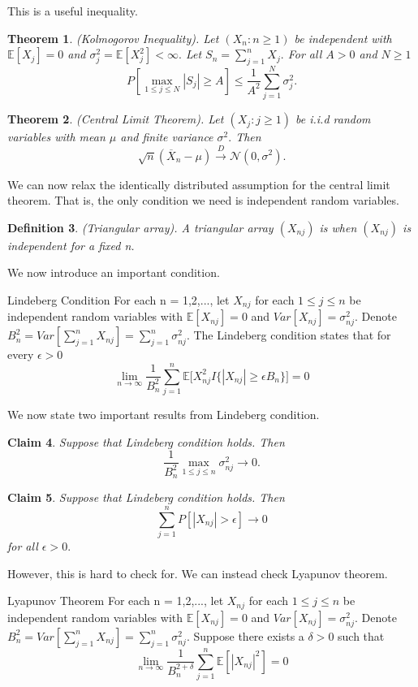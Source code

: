 \documentclass[twoside]{article}
\newcounter{lecnum}
\newtheorem{theorem}{Theorem}[lecnum]
\newtheorem{claim}[theorem]{Claim}
\newtheorem{definition}[theorem]{Definition}
\begin{document}
This is a useful inequality.
\begin{theorem}(Kolmogorov Inequality). Let $(X_n: n \geq 1)$ be independent with $\mathbb{E}[X_j] = 0$ and $\sigma_{j}^{2} = \mathbb{E}[X_j^2] < \infty.$ Let $S_n = \sum_{j=1}^{n}X_j.$ For all $A > 0$ and $N \geq 1$
$$
P[\max_{1 \leq j \leq N}|S_j| \geq A] \leq \frac{1}{A^2}\sum_{j=1}^{N}\sigma_{j}^{2}.
$$
\end{theorem}

\begin{theorem}(Central Limit Theorem). Let $(X_j: j \geq 1)$ be i.i.d random variables with mean $\mu$ and finite variance $\sigma^2.$ Then 
$$
\sqrt{n}(\overline{X}_n - \mu) \xrightarrow{D} \mathcal{N}(0, \sigma^2).
$$
\end{theorem}


We can now relax the identically distributed assumption for the central limit theorem. That is, the only condition we need is independent random variables. 

\begin{definition}(Triangular array). A triangular array $(X_{nj})$ is when $(X_{nj})$ is independent for a fixed n.
\end{definition}

We now introduce an important condition.
\begin{definition_exam}{Lindeberg Condition}{} For each n = 1,2,..., let $X_{nj}$ for each $1 \leq j \leq n$ be independent random variables with $\mathbb{E}[X_{nj}] = 0$ and $Var[X_{nj}] = \sigma_{nj}^{2}.$ Denote $B_{n}^{2} = Var[\sum_{j=1}^{n}X_{nj}] = \sum_{j=1}^{n}\sigma_{nj}^{2}.$ The Lindeberg condition states that for every $\epsilon > 0$
$$
\lim_{n \rightarrow \infty} \frac{1}{B_{n}^{2}}\sum_{j=1}^{n}\mathbb{E}\big[X_{nj}^{2}I\{|X_{nj}| \geq \epsilon B_n\} \big] = 0
$$
\end{definition_exam}

We now state two important results from Lindeberg condition.

\begin{claim} Suppose that Lindeberg condition holds. Then 
$$
\frac{1}{B_{n}^{2}}\max_{1 \leq j \leq n}\sigma_{nj}^{2} \rightarrow 0.
$$
\end{claim}

\begin{claim} Suppose that Lindeberg condition holds. Then 
$$
\sum_{j=1}^{n}P[|X_{nj}| > \epsilon] \rightarrow 0
$$
for all $\epsilon > 0.$
\end{claim}

However, this is hard to check for. We can instead check Lyapunov theorem.
\begin{definition_exam}{Lyapunov Theorem}{} For each n = 1,2,..., let $X_{nj}$ for each $1 \leq j \leq n$ be independent random variables with $\mathbb{E}[X_{nj}] = 0$ and $Var[X_{nj}] = \sigma_{nj}^{2}.$ Denote $B_{n}^{2} = Var[\sum_{j=1}^{n}X_{nj}] = \sum_{j=1}^{n}\sigma_{nj}^{2}.$  Suppose there exists a $\delta > 0$ such that 
$$
\lim_{n \rightarrow \infty} \frac{1}{B_{n}^{2 + \delta}} \sum_{j=1}^{n}\mathbb{E}[|X_{nj}|^{2}] = 0
$$
\end{definition_exam}
\end{document}
